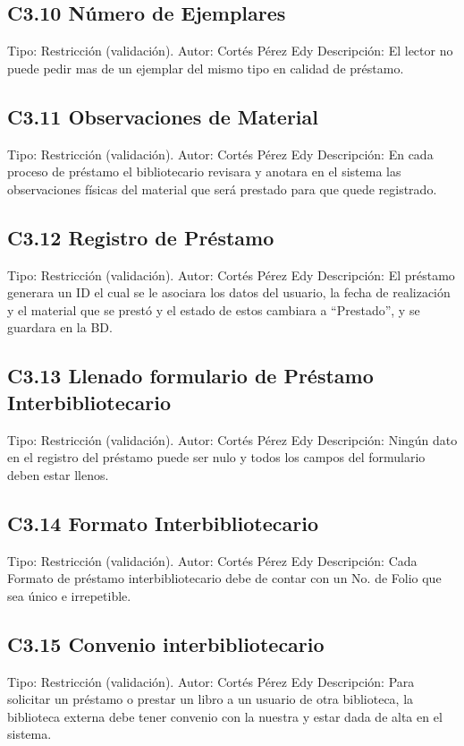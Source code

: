 \subsection{C3.10 Número de Ejemplares}
	\UCli Tipo: Restricción (validación).
	\UCli Autor: Cortés Pérez Edy
	\UCli Descripción: El lector no puede pedir mas de un ejemplar del mismo tipo en calidad de préstamo.
	
\subsection{C3.11 Observaciones de Material}
	\UCli Tipo: Restricción (validación).
	\UCli Autor: Cortés Pérez Edy
	\UCli Descripción: En cada proceso de préstamo el bibliotecario revisara y anotara en el sistema las observaciones físicas del material que será prestado para que quede registrado.
	
\subsection{C3.12 Registro de Préstamo}
	\UCli Tipo: Restricción (validación).
	\UCli Autor: Cortés Pérez Edy
	\UCli Descripción: El préstamo generara un ID el cual se le asociara los datos del usuario, la fecha de realización y el material que se prestó y el estado de estos cambiara a “Prestado”, y se guardara en la BD.
	
\subsection{C3.13 Llenado formulario de Préstamo Interbibliotecario}
	\UCli Tipo: Restricción (validación).
	\UCli Autor: Cortés Pérez Edy
	\UCli Descripción: Ningún dato en el registro del préstamo puede ser nulo y todos los campos del formulario deben estar llenos.
	
\subsection{C3.14 Formato Interbibliotecario}
	\UCli Tipo: Restricción (validación).
	\UCli Autor: Cortés Pérez Edy
	\UCli Descripción: Cada Formato de préstamo interbibliotecario debe de contar con un No. de Folio que sea único e irrepetible.
	
\subsection{C3.15 Convenio interbibliotecario}
	\UCli Tipo: Restricción (validación).
	\UCli Autor: Cortés Pérez Edy
	\UCli Descripción: Para solicitar un préstamo o prestar un libro a un usuario de otra biblioteca, la biblioteca externa debe tener convenio con la nuestra y estar dada de alta en el sistema. 

